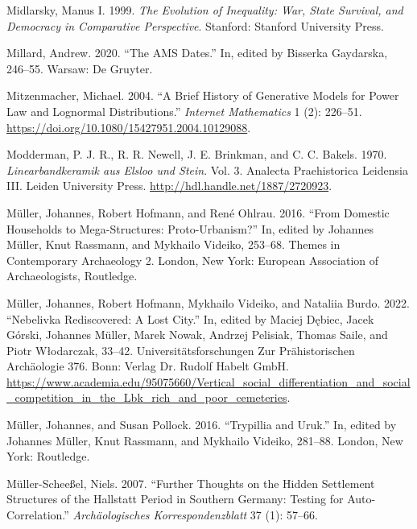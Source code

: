 \documentclass[
  12pt,
  a4paper, twoside]{book}
\newlength{\cslhangindent}
\newlength{\cslentryspacingunit} %
\newenvironment{CSLReferences}[2] %
 {%
  \setlength{\parindent}{0pt}
  \ifodd #1
  \let\oldpar\par
  \def\par{\hangindent=\cslhangindent\oldpar}
  \fi
  \setlength{\parskip}{#2\cslentryspacingunit}
 }%
 {}
\begin{document}
\begin{CSLReferences}{1}{0}
\leavevmode{}%
Midlarsky, Manus I. 1999. \emph{The Evolution of Inequality: War, State Survival, and Democracy in Comparative Perspective}. Stanford: Stanford University Press.

\leavevmode{}%
Millard, Andrew. 2020. {``The AMS Dates.''} In, edited by Bisserka Gaydarska, 246--55. Warsaw: De Gruyter.

\leavevmode{}%
Mitzenmacher, Michael. 2004. {``A Brief History of Generative Models for Power Law and Lognormal Distributions.''} \emph{Internet Mathematics} 1 (2): 226--51. \url{https://doi.org/10.1080/15427951.2004.10129088}.

\leavevmode{}%
Modderman, P. J. R., R. R. Newell, J. E. Brinkman, and C. C. Bakels. 1970. \emph{Linearbandkeramik aus Elsloo und Stein}. Vol. 3. Analecta Praehistorica Leidensia III. Leiden University Press. \url{http://hdl.handle.net/1887/2720923}.

\leavevmode{}%
Müller, Johannes, Robert Hofmann, and René Ohlrau. 2016. {``From Domestic Households to Mega-Structures: Proto-Urbanism?''} In, edited by Johannes Müller, Knut Rassmann, and Mykhailo Videiko, 253--68. Themes in Contemporary Archaeology 2. London, New York: European Association of Archaeologists, Routledge.

\leavevmode{}%
Müller, Johannes, Robert Hofmann, Mykhailo Videiko, and Nataliia Burdo. 2022. {``Nebelivka {\textendash} Rediscovered: A Lost City.''} In, edited by Maciej Dębiec, Jacek Górski, Johannes Müller, Marek Nowak, Andrzej Pelisiak, Thomas Saile, and Piotr Włodarczak, 33--42. Universitätsforschungen Zur Prähistorischen Archäologie 376. Bonn: Verlag Dr. Rudolf Habelt GmbH. \url{https://www.academia.edu/95075660/Vertical_social_differentiation_and_social_competition_in_the_Lbk_rich_and_poor_cemeteries}.

\leavevmode{}%
Müller, Johannes, and Susan Pollock. 2016. {``Trypillia and Uruk.''} In, edited by Johannes Müller, Knut Rassmann, and Mykhailo Videiko, 281--88. London, New York: Routledge.

\leavevmode{}%
Müller-Scheeßel, Niels. 2007. {``Further Thoughts on the Hidden Settlement Structures of the Hallstatt Period in Southern Germany: Testing for Auto-Correlation.''} \emph{Archäologisches Korrespondenzblatt} 37 (1): 57--66.


\end{CSLReferences}
\end{document}

